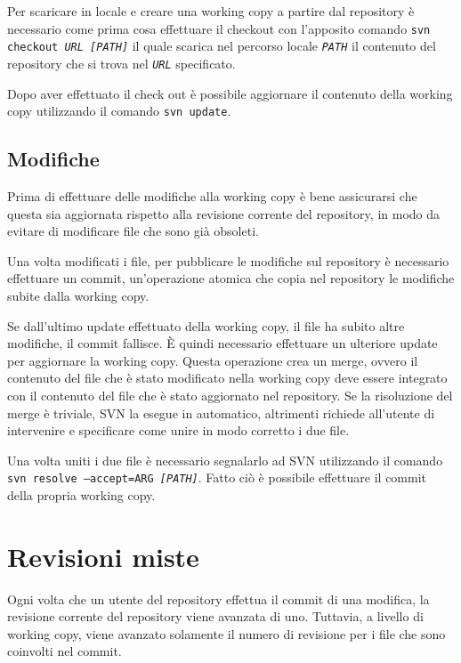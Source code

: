 Per scaricare in locale e creare una working copy a partire dal repository è necessario come prima cosa effettuare il checkout con l'apposito comando \texttt{svn checkout \textit{URL} \textit{[PATH]}} il quale scarica nel percorso locale \textit{\texttt{PATH}} il contenuto del repository che si trova nel \textit{\texttt{URL}} specificato.

Dopo aver effettuato il check out è possibile aggiornare il contenuto della working copy utilizzando il comando \texttt{svn update}.

\subsection{Modifiche}

Prima di effettuare delle modifiche alla working copy è bene assicurarsi che questa sia aggiornata rispetto alla revisione corrente del repository, in modo da evitare di modificare file che sono già obsoleti.

Una volta modificati i file, per pubblicare le modifiche sul repository è necessario effettuare un commit, un'operazione atomica che copia nel repository le modifiche subite dalla working copy.

Se dall'ultimo update effettuato della working copy, il file ha subito altre modifiche, il commit fallisce. 
\`E quindi necessario effettuare un ulteriore update per aggiornare la working copy. 
Questa operazione crea un merge, ovvero il contenuto del file che è stato modificato nella working copy deve essere integrato con il contenuto del file che è stato aggiornato nel repository. Se la risoluzione del merge è triviale, SVN la esegue in automatico, altrimenti richiede all'utente di intervenire e specificare come unire in modo corretto i due file.

Una volta uniti i due file è necessario segnalarlo ad SVN utilizzando il comando \texttt{svn resolve --accept=ARG \textit{[PATH]}}.
Fatto ciò è possibile effettuare il commit della propria working copy.

\section{Revisioni miste}

Ogni volta che un utente del repository effettua il commit di una modifica, la revisione corrente del repository viene avanzata di uno. Tuttavia, a livello di working copy, viene avanzato solamente il numero di revisione per i file che sono coinvolti nel commit.

